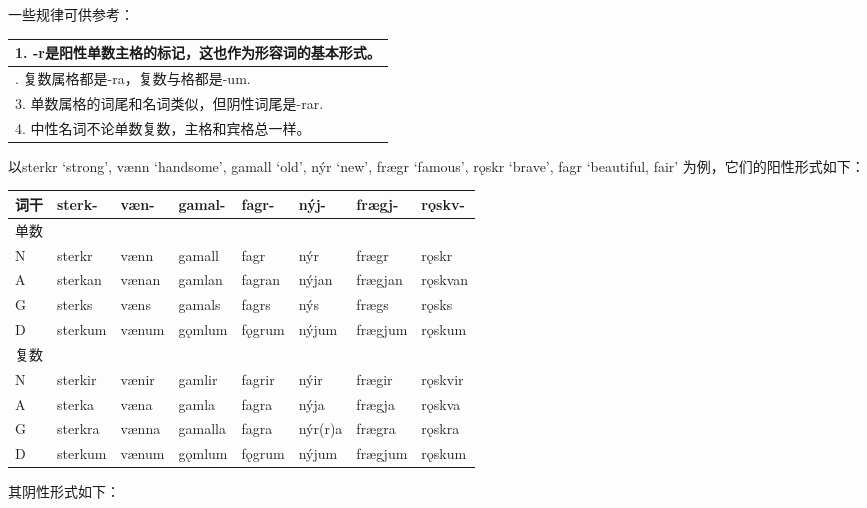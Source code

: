 一些规律可供参考：

\begin{longtable}{l}
  \toprule
  1. -r是阳性单数主格的标记，这也作为形容词的基本形式。 \\
  \midrule
  \endhead
  \bottomrule
  \endfoot
  2. 复数属格都是-ra，复数与格都是-um.                  \\
  3. 单数属格的词尾和名词类似，但阴性词尾是-rar.        \\
  4. 中性名词不论单数复数，主格和宾格总一样。           \\
\end{longtable}

以sterkr `strong‌', vænn `handsome‌', gamall `old‌', nýr `new‌', frægr
`famous‌', rǫskr `brave‌', fagr `beautiful, fair'
为例，它们的阳性形式如下：

\begin{longtable}{llllllll}
  \toprule
  词干 & sterk-  & væn-  & gamal-  & fagr-  & nýj-    & frægj-  & rǫskv-  \\
  \midrule
  \endhead
  \bottomrule
  \endfoot
  单数 &         &       &         &        &         &         &         \\
  N    & sterkr  & vænn  & gamall  & fagr   & nýr     & frægr   & rǫskr   \\
  A    & sterkan & vænan & gamlan  & fagran & nýjan   & frægjan & rǫskvan \\
  G    & sterks  & væns  & gamals  & fagrs  & nýs     & frægs   & rǫsks   \\
  D    & sterkum & vænum & gǫmlum  & fǫgrum & nýjum   & frægjum & rǫskum  \\
  复数 &         &       &         &        &         &         &         \\
  N    & sterkir & vænir & gamlir  & fagrir & nýir    & frægir  & rǫskvir \\
  A    & sterka  & væna  & gamla   & fagra  & nýja    & frægja  & rǫskva  \\
  G    & sterkra & vænna & gamalla & fagra  & nýr(r)a & frægra  & rǫskra  \\
  D    & sterkum & vænum & gǫmlum  & fǫgrum & nýjum   & frægjum & rǫskum  \\
\end{longtable}

其阴性形式如下：

